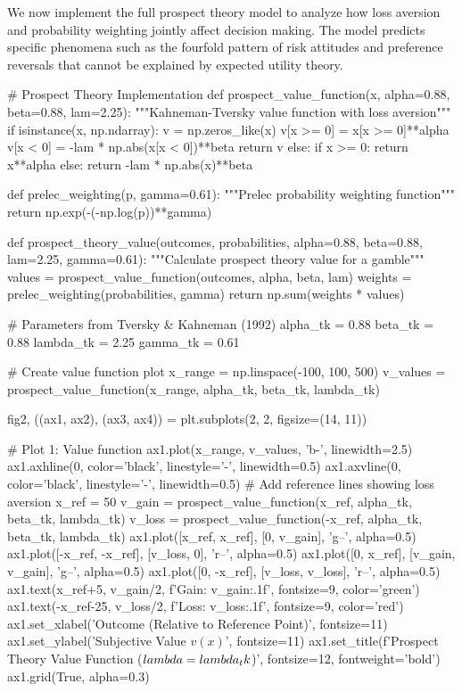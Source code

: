 \documentclass[a4paper, 11pt]{article}
\begin{document}
We now implement the full prospect theory model to analyze how loss aversion and probability
weighting jointly affect decision making. The model predicts specific phenomena such as the
fourfold pattern of risk attitudes and preference reversals that cannot be explained by
expected utility theory.

\begin{pycode}
# Prospect Theory Implementation
def prospect_value_function(x, alpha=0.88, beta=0.88, lam=2.25):
    """Kahneman-Tversky value function with loss aversion"""
    if isinstance(x, np.ndarray):
        v = np.zeros_like(x)
        v[x >= 0] = x[x >= 0]**alpha
        v[x < 0] = -lam * np.abs(x[x < 0])**beta
        return v
    else:
        if x >= 0:
            return x**alpha
        else:
            return -lam * np.abs(x)**beta

def prelec_weighting(p, gamma=0.61):
    """Prelec probability weighting function"""
    return np.exp(-(-np.log(p))**gamma)

def prospect_theory_value(outcomes, probabilities, alpha=0.88, beta=0.88, lam=2.25, gamma=0.61):
    """Calculate prospect theory value for a gamble"""
    values = prospect_value_function(outcomes, alpha, beta, lam)
    weights = prelec_weighting(probabilities, gamma)
    return np.sum(weights * values)

# Parameters from Tversky & Kahneman (1992)
alpha_tk = 0.88
beta_tk = 0.88
lambda_tk = 2.25
gamma_tk = 0.61

# Create value function plot
x_range = np.linspace(-100, 100, 500)
v_values = prospect_value_function(x_range, alpha_tk, beta_tk, lambda_tk)

fig2, ((ax1, ax2), (ax3, ax4)) = plt.subplots(2, 2, figsize=(14, 11))

# Plot 1: Value function
ax1.plot(x_range, v_values, 'b-', linewidth=2.5)
ax1.axhline(0, color='black', linestyle='-', linewidth=0.5)
ax1.axvline(0, color='black', linestyle='-', linewidth=0.5)
# Add reference lines showing loss aversion
x_ref = 50
v_gain = prospect_value_function(x_ref, alpha_tk, beta_tk, lambda_tk)
v_loss = prospect_value_function(-x_ref, alpha_tk, beta_tk, lambda_tk)
ax1.plot([x_ref, x_ref], [0, v_gain], 'g--', alpha=0.5)
ax1.plot([-x_ref, -x_ref], [v_loss, 0], 'r--', alpha=0.5)
ax1.plot([0, x_ref], [v_gain, v_gain], 'g--', alpha=0.5)
ax1.plot([0, -x_ref], [v_loss, v_loss], 'r--', alpha=0.5)
ax1.text(x_ref+5, v_gain/2, f'Gain: {v_gain:.1f}', fontsize=9, color='green')
ax1.text(-x_ref-25, v_loss/2, f'Loss: {v_loss:.1f}', fontsize=9, color='red')
ax1.set_xlabel('Outcome (Relative to Reference Point)', fontsize=11)
ax1.set_ylabel('Subjective Value $v(x)$', fontsize=11)
ax1.set_title(f'Prospect Theory Value Function ($\\lambda={lambda_tk}$)', fontsize=12, fontweight='bold')
ax1.grid(True, alpha=0.3)


\end{pycode}
\end{document}
